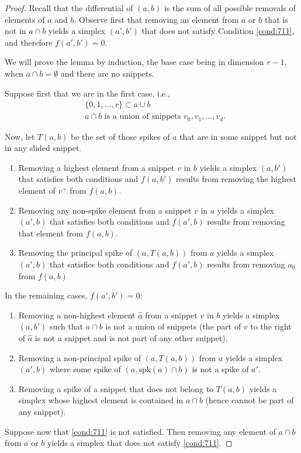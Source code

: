 	\begin{proof} Recall that the differential of $(a,b)$ is the sum of all possible removals of elements of $a$ and $b$. Observe first that removing an element from $a$ or $b$ that is not in $a\cap b$ yields a simplex $(a',b')$ that does not satisfy Condition \eqref{cond:711}, and therefore $f(a',b') = 0$.

		We will prove the lemma by induction, the base case being in dimension $r-1$, when $a\cap b = \emptyset$ and there are no snippets.

		Suppose first that we are in the first case, i.e.,
		\begin{align}\label{cond:711}
			&\{0,1,\ldots,r\}\subset a\cup b \\ \label{cond:712}
			&a\cap b\text{ is a union of snippets }v_0,v_1,\ldots,v_d.
		\end{align}


		Now, let $T(a,b)$ be the set of those spikes of $a$ that are in some snippet but not in any slided snippet.
		\begin{enumerate}
			\item Removing a highest element from a snippet $v$ in $b$ yields a simplex $(a,b')$ that satisfies both conditions and $f(a,b')$ results from removing the highest element of $v^+$ from $f(a,b)$.
			\item Removing any non-spike element from a snippet $v$ in $a$ yields a simplex $(a',b)$ that satisfies both conditions and $f(a',b)$ results from removing that element from $f(a,b)$.
			\item Removing the principal spike of $(a,T(a,b))$ from $a$ yields a simplex $(a',b)$ that satisfies both conditions and $f(a',b)$ results from removing $a_0$ from $f(a,b)$
		\end{enumerate}
		In the remaining cases, $f(a',b')=0$:
		\begin{enumerate}
			\item Removing a non-highest element $\hat{a}$ from a snippet $v$ in $b$ yields a simplex $(a,b')$ such that $a\cap b$ is not a union of snippets (the part of $v$ to the right of $\hat{a}$ is not a snippet and is not part of any other snippet).
			\item Removing a non-principal spike of $(a,T(a,b))$ from $a$ yields a simplex $(a',b)$ where some spike of $(a,\mathrm{spk}(a)\cap b)$ is not a spike of $a'$.
			\item Removing a spike of a snippet that does not belong to $T(a,b)$ yields a simplex whose highest element is contained in $a\cap b$ (hence cannot be part of any snippet).
		\end{enumerate}
		Suppose now that \eqref{cond:711} is not satisfied. Then removing any element of $a\cap b$ from $a$ or $b$ yields a simplex that does not satisfy \eqref{cond:711}.


\end{proof}
